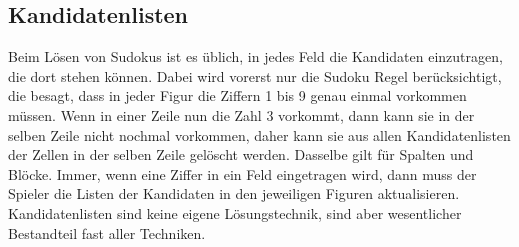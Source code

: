 \subsection{Kandidatenlisten}
\label{Kandidatenlisten}
Beim Lösen von Sudokus ist es üblich, in jedes Feld die Kandidaten einzutragen, die dort stehen können. Dabei wird vorerst nur die Sudoku Regel berücksichtigt, die besagt, dass in jeder Figur die Ziffern 1 bis 9 genau einmal vorkommen müssen. Wenn in einer Zeile nun die Zahl 3 vorkommt, dann kann sie in der selben Zeile nicht nochmal vorkommen, daher kann sie aus allen Kandidatenlisten der Zellen in der selben Zeile gelöscht werden. Dasselbe gilt für Spalten und Blöcke. Immer, wenn eine Ziffer in ein Feld eingetragen wird, dann muss der Spieler die Listen der Kandidaten in den jeweiligen Figuren aktualisieren.\\
Kandidatenlisten sind keine eigene Lösungstechnik, sind aber wesentlicher Bestandteil fast aller Techniken.\\